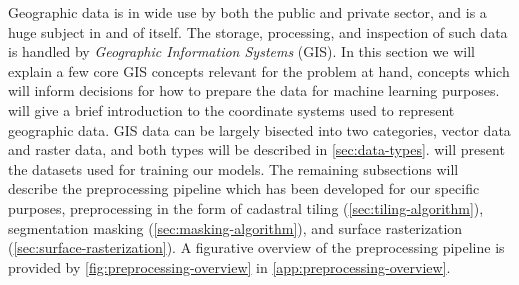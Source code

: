 Geographic data is in wide use by both the public and private sector, and is a huge subject in and of itself.
The storage, processing, and inspection of such data is handled by \textit{Geographic Information Systems} (GIS).
In this section we will explain a few core GIS concepts relevant for the problem at hand, concepts which will inform decisions for how to prepare the data for machine learning purposes.
 will give a brief introduction to the coordinate systems used to represent geographic data.
GIS data can be largely bisected into two categories, vector data and raster data, and both types will be described in \cref{sec:data-types}.
 will present the datasets used for training our models.
The remaining subsections will describe the preprocessing pipeline which has been developed for our specific purposes, preprocessing in the form of cadastral tiling (\cref{sec:tiling-algorithm}), segmentation masking (\cref{sec:masking-algorithm}), and surface rasterization (\cref{sec:surface-rasterization}).
A figurative overview of the preprocessing pipeline is provided by \cref{fig:preprocessing-overview} in \cref{app:preprocessing-overview}.
